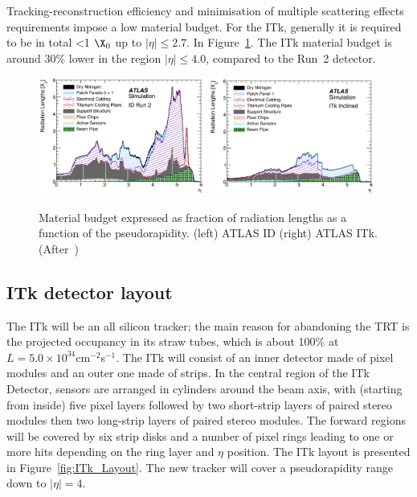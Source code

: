  
 Tracking-reconstruction efficiency and minimisation of multiple scattering effects requirements impose a 
 low material budget. For the ITk, generally it is required to be in total <1 $\X_0$ up to $|\eta|\le2.7$.
 In Figure~\ref{fig:ITk_X0}.
  The ITk material budget is around 30\% lower in the region $|\eta|\le4.0$, compared to the Run~2 detector.
\begin{figure}[!htpb]
\centering
\includegraphics[width=0.49\textwidth]{ID_X0.png}
\includegraphics[width=0.49\textwidth]{ITk_X0.png}
\caption{\label{fig:ITk_X0}Material budget expressed as fraction of radiation lengths as a function of the 
pseudorapidity. (left) ATLAS ID (right) ATLAS ITk. (After~\cite{ITkStripsTDR})}
\end{figure}
  
\subsection{ITk detector layout}

The ITk will be an all silicon tracker; the main reason for abandoning the TRT is the projected occupancy 
in its straw tubes, which is about 100\% at $L=5.0\times10^{34}$cm$^{-2}$s$^{-1}$. 
The ITk will consist of an inner detector made of pixel modules and an outer one made of strips. 
In the central region of the ITk Detector, sensors are arranged in cylinders around the beam axis, with (starting from inside) five pixel layers followed by two short-strip layers of paired stereo modules then two long-strip layers of paired stereo modules. The forward regions will be covered by six strip disks and a number of pixel rings leading to one or more hits depending on the ring layer and $\eta$ position. 
The ITk layout is presented in Figure~\ref{fig:ITk_Layout}. The new tracker will cover a pseudorapidity range down to $|\eta|=4$. 

